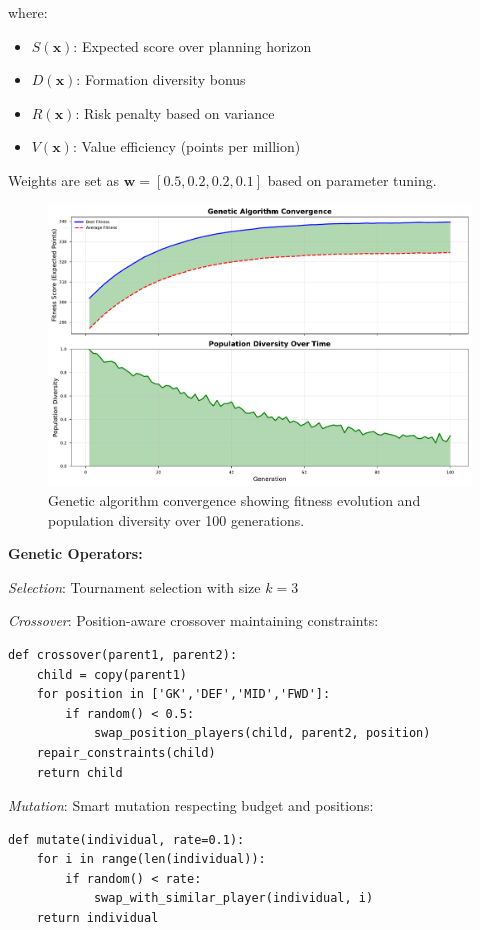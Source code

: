 \documentclass[10pt,a4paper,twocolumn]{article}
\begin{document}
where:
\begin{itemize}
\item $S(\mathbf{x})$: Expected score over planning horizon
\item $D(\mathbf{x})$: Formation diversity bonus
\item $R(\mathbf{x})$: Risk penalty based on variance
\item $V(\mathbf{x})$: Value efficiency (points per million)
\end{itemize}

Weights are set as $\mathbf{w} = [0.5, 0.2, 0.2, 0.1]$ based on parameter tuning.

\begin{figure}[h]
\centering
\includegraphics[width=\columnwidth]{figures/optimization_performance.pdf}
\caption{Genetic algorithm convergence showing fitness evolution and population diversity over 100 generations.}
\label{fig:optimization}
\end{figure}

\textbf{Genetic Operators:}

\textit{Selection}: Tournament selection with size $k=3$

\textit{Crossover}: Position-aware crossover maintaining constraints:
\begin{lstlisting}
def crossover(parent1, parent2):
    child = copy(parent1)
    for position in ['GK','DEF','MID','FWD']:
        if random() < 0.5:
            swap_position_players(child, parent2, position)
    repair_constraints(child)
    return child
\end{lstlisting}

\textit{Mutation}: Smart mutation respecting budget and positions:
\begin{lstlisting}
def mutate(individual, rate=0.1):
    for i in range(len(individual)):
        if random() < rate:
            swap_with_similar_player(individual, i)
    return individual
\end{lstlisting}
\end{document}
